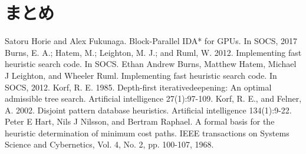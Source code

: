 \documentclass[a4paper,11pt,oneside,openany]{jsbook}
\begin{document}
\section{まとめ}



\begin{thebibliography}{10}
   Satoru Horie and Alex Fukunaga. Block-Parallel IDA* for GPUs. In SOCS, 2017 
   Burns, E. A.; Hatem, M.; Leighton,  M. J.; and Ruml, W. 2012. Implementing fast heuristic search code. In SOCS.
  Ethan Andrew Burns, Matthew Hatem, Michael J Leighton, and Wheeler Ruml. Implementing fast heuristic search code. In SOCS, 2012.
  Korf, R. E. 1985. Depth-first iterativedeepening: An optimal admissible tree search. Artificial intelligence 27(1):97-109.
  Korf, R. E., and Felner, A. 2002. Disjoint pattern database heuristics. Artificial intelligence 134(1):9-22.
  Peter E Hart, Nils J Nilsson, and Bertram Raphael. A formal basis for the heuristic determination of minimum cost paths. IEEE transactions on Systems Science and Cybernetics, Vol. 4, No. 2, pp. 100-107, 1968. 

\end{thebibliography}
\end{document}
